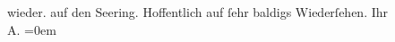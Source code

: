 \begin{ledgroupsized}[t]{13cm}
{{{                  wieder.}}}\label{K_L02999-2h}{ }{\pb}auf den Se{\geminationm}ering. Hoffentlich auf ſehr baldigs
               Wiederſehen.\pend
           \pstart
           Ihr {\\[\baselineskip]}\spacefill\mbox{A.}\pend
           \leftskip=0em{}
         
         \endnumbering{}\end{ledgroupsized}  \newcommand{\dateiname}{L02999}\newcommand{\titel}{Arthur Schnitzler an Felix Salten, 29. 4. 1905}\newcommand{\editorInnen}{Martin Anton Müller und Laura Untner}
      
